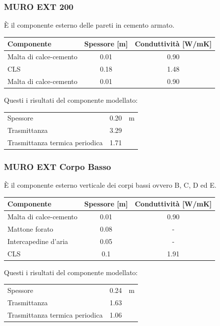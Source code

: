 \subsubsection{MURO EXT 200}
È il componente esterno delle pareti in cemento armato.
\begin{center}
	\begin{tabular}{lcc}
		\toprule
		Componente & Spessore [m] & Conduttività [\si{W/mK}] \\
		\midrule
		Malta di calce-cemento & \num{0.01} & \num{0.90} \\
		CLS & \num{0.18} & \num{1.48}\\
		Malta di calce-cemento & \num{0.01} & \num{0.90} \\
		\bottomrule
	\end{tabular}
\end{center}
Questi i risultati del componente modellato:
\begin{center}
	\begin{tabular}{lcc}
		\toprule
		Spessore & \num{0.20} & \si{m}\\
		Trasmittanza & \num{3.29} & \trasm\\
		Trasmittanza termica periodica & \num{1.71} & \trasm\\
		\bottomrule
	\end{tabular}
\end{center}

\subsubsection{MURO EXT Corpo Basso}
È il componente esterno verticale dei corpi bassi ovvero B, C, D ed E.
\begin{center}
	\begin{tabular}{lcc}
		\toprule
		Componente & Spessore [m] & Conduttività [\si{W/mK}] \\
		\midrule
		Malta di calce-cemento & \num{0.01} & \num{0.90} \\
		Mattone forato & \num{0.08} & -\\
		Intercapedine d'aria & \num{0.05} & - \\
		CLS & \num{0.1} & \num{1.91}\\
		\bottomrule
	\end{tabular}
\end{center}
Questi i risultati del componente modellato:
\begin{center}
	\begin{tabular}{lcc}
		\toprule
		Spessore & \num{0.24} & \si{m}\\
		Trasmittanza & \num{1.63} & \trasm\\
		Trasmittanza termica periodica & \num{1.06} & \trasm\\
		\bottomrule
	\end{tabular}
\end{center}
